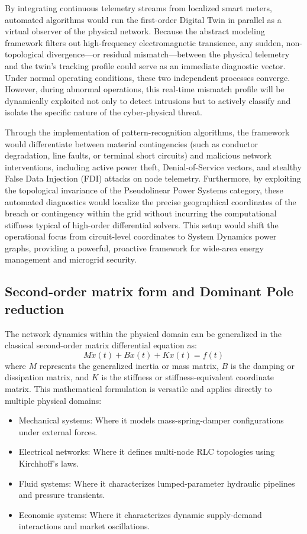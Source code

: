\documentclass[11pt, a4paper]{article}
\begin{document}
By integrating continuous telemetry streams from localized smart meters, automated algorithms would run the first-order Digital Twin in parallel as a virtual observer of the physical network. Because the abstract modeling framework filters out high-frequency electromagnetic transience, any sudden, non-topological divergence—or residual mismatch—between the physical telemetry and the twin's tracking profile could serve as an immediate diagnostic vector. Under normal operating conditions, these two independent processes converge. However, during abnormal operations, this real-time mismatch profile will be dynamically exploited not only to detect intrusions but to actively classify and isolate the specific nature of the cyber-physical threat.

Through the implementation of pattern-recognition algorithms, the framework would differentiate between material contingencies (such as conductor degradation, line faults, or terminal short circuits) and malicious network interventions, including active power theft, Denial-of-Service vectors, and stealthy False Data Injection (FDI) attacks on node telemetry. Furthermore, by exploiting the topological invariance of the Pseudolinear Power Systems category, these automated diagnostics would localize the precise geographical coordinates of the breach or contingency within the grid without incurring the computational stiffness typical of high-order differential solvers. This setup would shift the operational focus from circuit-level coordinates to System Dynamics power graphs, providing a powerful, proactive framework for wide-area energy management and microgrid security.


\subsection{Second-order matrix form and Dominant Pole reduction}
The network dynamics within the physical domain can be generalized in the classical second-order matrix differential equation as:
\begin{equation}
    M \ddot{x}(t) + B \dot{x}(t) + K x(t) = f(t)
\end{equation}
where $M$ represents the generalized inertia or mass matrix, $B$ is the damping or dissipation matrix, and $K$ is the stiffness or stiffness-equivalent coordinate matrix. This mathematical formulation is versatile and applies directly to multiple physical domains:
\begin{itemize}
    \item {Mechanical systems:} Where it models mass-spring-damper configurations under external forces.
    \item {Electrical networks:} Where it defines multi-node RLC topologies using Kirchhoff's laws.
    \item {Fluid systems:} Where it characterizes lumped-parameter hydraulic pipelines and pressure transients.
    \item {Economic systems:} Where it characterizes dynamic supply-demand interactions and market oscillations.
\end{itemize}
\end{document}
